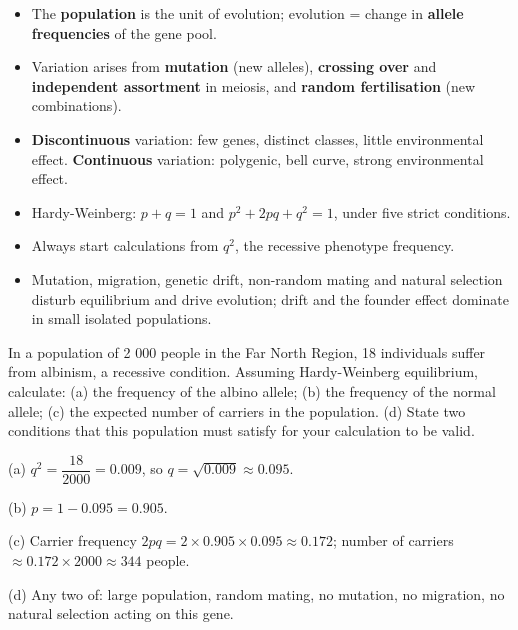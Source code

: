 \documentclass[11pt]{article}
\begin{document}
\begin{aretenir}
\begin{itemize}
\item The \textbf{population} is the unit of evolution; evolution = change in \textbf{allele frequencies} of the gene pool.
\item Variation arises from \textbf{mutation} (new alleles), \textbf{crossing over} and \textbf{independent assortment} in meiosis, and \textbf{random fertilisation} (new combinations).
\item \textbf{Discontinuous} variation: few genes, distinct classes, little environmental effect. \textbf{Continuous} variation: polygenic, bell curve, strong environmental effect.
\item Hardy-Weinberg: $p + q = 1$ and $p^{2} + 2pq + q^{2} = 1$, under five strict conditions.
\item Always start calculations from $q^{2}$, the recessive phenotype frequency.
\item Mutation, migration, genetic drift, non-random mating and natural selection disturb equilibrium and drive evolution; drift and the founder effect dominate in small isolated populations.
\end{itemize}
\end{aretenir}

\begin{exercice}
In a population of 2 000 people in the Far North Region, 18 individuals suffer from albinism, a recessive condition. Assuming Hardy-Weinberg equilibrium, calculate: (a) the frequency of the albino allele; (b) the frequency of the normal allele; (c) the expected number of carriers in the population. (d) State two conditions that this population must satisfy for your calculation to be valid.
\end{exercice}

\begin{corrige}[Exercise 1]
(a) $q^{2} = \dfrac{18}{2000} = 0.009$, so $q = \sqrt{0.009} \approx 0.095$.

(b) $p = 1 - 0.095 = 0.905$.

(c) Carrier frequency $2pq = 2 \times 0.905 \times 0.095 \approx 0.172$; number of carriers $\approx 0.172 \times 2000 \approx 344$ people.

(d) Any two of: large population, random mating, no mutation, no migration, no natural selection acting on this gene.
\end{corrige}
\end{document}
